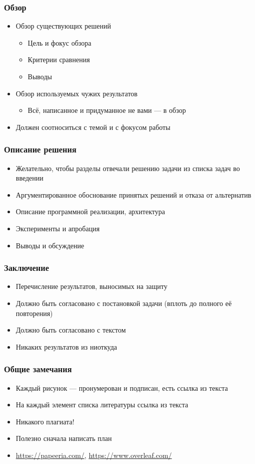 \documentclass[xetex,mathserif,serif]{beamer}
\begin{document}
	\begin{frame}
		\frametitle{Обзор}
		\begin{itemize}
			\item Обзор существующих решений
			\begin{itemize}
				\item Цель и фокус обзора
				\item Критерии сравнения
				\item Выводы
			\end{itemize}
			\item Обзор используемых чужих результатов
			\begin{itemize}
				\item  Всё, написанное и придуманное не вами --- в обзор
			\end{itemize}
			\item Должен соотноситься с темой и с фокусом работы
		\end{itemize}
	\end{frame}

	\begin{frame}
		\frametitle{Описание решения}
		\begin{itemize}
			\item Желательно, чтобы разделы отвечали решению задачи из списка задач во введении
			\item Аргументированное обоснование принятых решений и отказа от альтернатив
			\item Описание программной реализации, архитектура
			\item Эксперименты и апробация
			\item Выводы и обсуждение
		\end{itemize}
	\end{frame}

	\begin{frame}
		\frametitle{Заключение}
		\begin{itemize}
			\item Перечисление результатов, выносимых на защиту
			\item Должно быть согласовано с постановкой задачи (вплоть до полного её повторения)
			\item Должно быть согласовано с текстом
			\item Никаких результатов из ниоткуда
		\end{itemize}
	\end{frame}

	\begin{frame}
		\frametitle{Общие замечания}
		\begin{itemize}
			\item Каждый рисунок --- пронумерован и подписан, есть ссылка из текста
			\item На каждый элемент списка литературы ссылка из текста
			\item Никакого плагиата!
			\item Полезно сначала написать план
			\item \url{https://papeeria.com/}, \url{https://www.overleaf.com/}
		\end{itemize}
	\end{frame}
\end{document}
